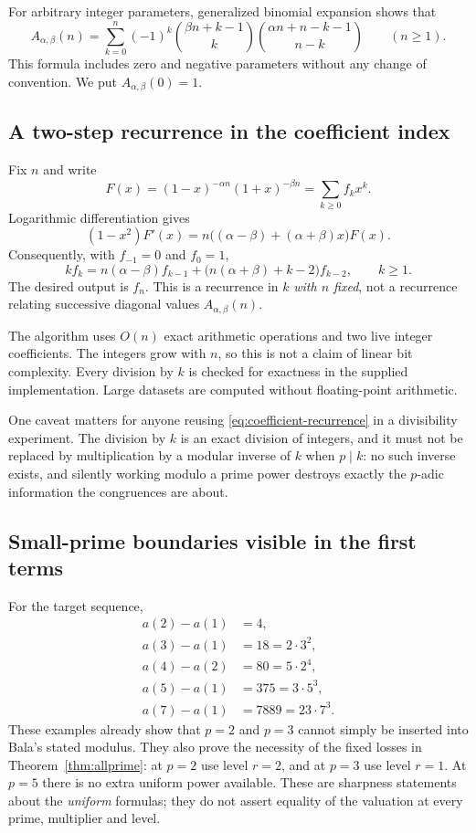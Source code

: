\documentclass[11pt,a4paper]{article}
\numberwithin{equation}{section}
\theoremstyle{definition}
\theoremstyle{remark}
\newcommand{\A}{A_{\alpha,\beta}}
\begin{document}
For arbitrary integer parameters, generalized binomial expansion shows that
\begin{equation}\label{eq:signed-sum}
 \A(n)=\sum_{k=0}^n(-1)^k
 \binom{\beta n+k-1}{k}
 \binom{\alpha n+n-k-1}{n-k}\qquad(n\ge1).
\end{equation}
This formula includes zero and negative parameters without any change of
convention. We put $\A(0)=1$.

\subsection{A two-step recurrence in the coefficient index}
Fix $n$ and write
\[
 F(x)=(1-x)^{-\alpha n}(1+x)^{-\beta n}
      =\sum_{k\ge0}f_kx^k.
\]
Logarithmic differentiation gives
\[
 (1-x^2)F'(x)=n\bigl((\alpha-\beta)+(\alpha+\beta)x\bigr)F(x).
\]
Consequently, with $f_{-1}=0$ and $f_0=1$,
\begin{equation}\label{eq:coefficient-recurrence}
 kf_k=n(\alpha-\beta)f_{k-1}
      +\bigl(n(\alpha+\beta)+k-2\bigr)f_{k-2},\qquad k\ge1.
\end{equation}
The desired output is $f_n$. This is a recurrence in $k$ \emph{with $n$
fixed}, not a recurrence relating successive diagonal values $\A(n)$.

The algorithm uses $O(n)$ exact arithmetic operations and two live integer
coefficients. The integers grow with $n$, so this is not a claim of linear
bit complexity. Every division by $k$ is checked for exactness in the
supplied implementation. Large datasets are computed without floating-point
arithmetic.

One caveat matters for anyone reusing \eqref{eq:coefficient-recurrence} in a
divisibility experiment. The division by $k$ is an exact division of
integers, and it must not be replaced by multiplication by a modular inverse
of $k$ when $p\mid k$: no such inverse exists, and silently working modulo a
prime power destroys exactly the $p$-adic information the congruences are
about.

\subsection{Small-prime boundaries visible in the first terms}
For the target sequence,
\begin{align*}
 a(2)-a(1)&=4,\\
 a(3)-a(1)&=18=2\cdot3^2,\\
 a(4)-a(2)&=80=5\cdot2^4,\\
 a(5)-a(1)&=375=3\cdot5^3,\\
 a(7)-a(1)&=7889=23\cdot7^3.
\end{align*}
These examples already show that $p=2$ and $p=3$ cannot simply be inserted
into Bala's stated modulus. They also prove the necessity of the fixed
losses in Theorem~\ref{thm:allprime}: at $p=2$ use level $r=2$, and at
$p=3$ use level $r=1$. At $p=5$ there is no extra uniform power available.
These are sharpness statements about the \emph{uniform} formulas; they do not
assert equality of the valuation at every prime, multiplier and level.
\end{document}

